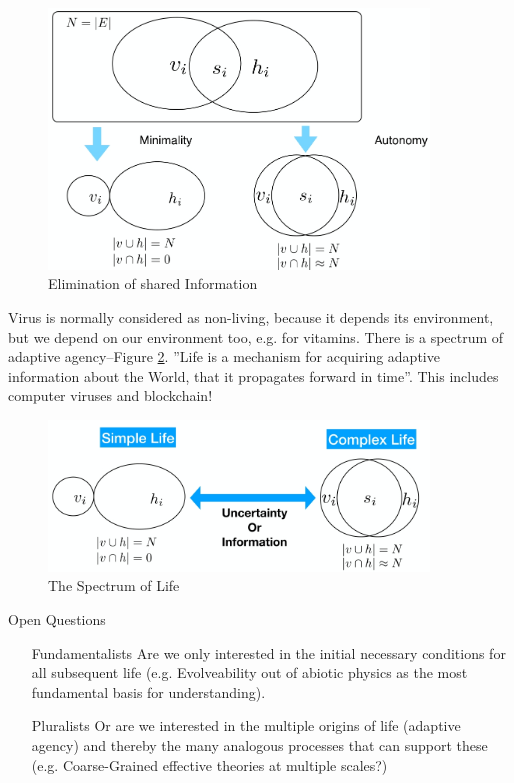 \documentclass[]{article}
\begin{document}
\begin{figure}[H]
	\caption{Elimination of shared Information}\label{fig:SpiegelmanMonsterVenn}
	\includegraphics[width=0.9\textwidth]{SpiegelmanMonsterVenn}
\end{figure}

 Virus is normally considered as non-living, because it depends its environment, but we depend on our environment too, e.g. for vitamins. There is a spectrum of adaptive agency--Figure \ref{fig:SpectrumOfLife}.  ''Life is a mechanism for acquiring adaptive information about the World, that it propagates forward in time''. This includes computer viruses and blockchain!
 
\begin{figure}[H]
	\caption{The Spectrum of Life}\label{fig:SpectrumOfLife}
	\includegraphics[width=0.9\textwidth]{SpectrumOfLife}
\end{figure}
Open Questions

\begin{itemize}
	\item[Fundamentalists] Are we only interested in the initial necessary conditions for all subsequent life (e.g. Evolveability out of abiotic physics as the most fundamental basis for understanding).
	\item[Pluralists] Or are we interested in the multiple origins of life (adaptive agency) and thereby the many analogous processes that can support these (e.g. 	Coarse-Grained effective theories at multiple scales?)
\end{itemize}
\end{document}
